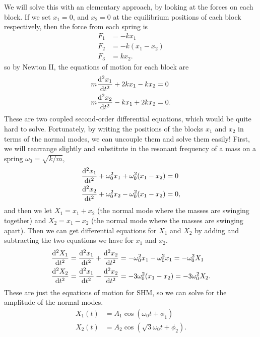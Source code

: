 \documentclass[../classical_mechanics.tex]{subfiles}
\begin{document}
\begin{example}
            We will solve this with an elementary approach, by looking at the forces on each block.
            If we set $x_1=0$, and $x_2=0$ at the equilibrium positions of each block respectively, then the force from each spring is
            \begin{align}
                F_1&=-kx_1\\
                F_2&=-k(x_1-x_2)\\
                F_3&=kx_2.
            \end{align}
            so by Newton II, the equations of motion for each block are
            \begin{align}
                &m\dv[2]{x_1}{t}+2kx_1-kx_2=0\\
                &m\dv[2]{x_2}{t}-kx_1+2kx_2=0.
            \end{align}
            These are two coupled second-order differential equations, which would be quite hard to solve.
            Fortunately, by writing the positions of the blocks $x_1$ and $x_2$ in terms of the normal modes, we can uncouple them and solve them easily!
            First, we will rearrange slightly and substitute in the resonant frequency of a mass on a spring $\omega_0=\sqrt{k/m}$,
            \begin{align}
                &\dv[2]{x_1}{t}+\omega_0^2x_1+\omega_0^2(x_1-x_2)=0\\
                &\dv[2]{x_2}{t}+\omega_0^2x_2-\omega_0^2(x_1-x_2)=0,
            \end{align}
            and then we let $X_1=x_1+x_2$ (the normal mode where the masses are swinging together) and $X_2=x_1-x_2$ (the normal mode where the masses are swinging apart).
            Then we can get differential equations for $X_1$ and $X_2$ by adding and subtracting the two equations we have for $x_1$ and $x_2$.
            \begin{align}
                &\dv[2]{X_1}{t}=\dv[2]{x_1}{t}+\dv[2]{x_2}{t}=-\omega_0^2x_1-\omega_0^2x_1=-\omega_0^2X_1\\
                &\dv[2]{X_2}{t}=\dv[2]{x_1}{t}-\dv[2]{x_2}{t}=-3\omega_0^2(x_1-x_2)=-3\omega_0^2X_2.
            \end{align}
            These are just the equations of motion for SHM, so we can solve for the amplitude of the normal modes.
            \begin{align}
                X_1(t)&=A_1\cos(\omega_0t+\phi_1)\\
                X_2(t)&=A_2\cos(\sqrt{3}\omega_0t+\phi_2).

\end{align}
\end{example}
\end{document}
